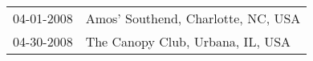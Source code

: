 \begin{supertabular}{ll}
 04-01-2008 &  Amos' Southend, Charlotte, NC, USA \\
 04-30-2008 &    The Canopy Club, Urbana, IL, USA \\
\end{supertabular}
